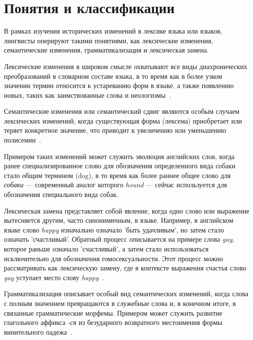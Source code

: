 \documentclass[LI,VKR]{HSEUniversity}
\begin{document}
\section{Понятия и классификации}

В рамках изучения исторических изменений в лексике языка или языков, лингвисты оперируют
такими понятиями, как лексические изменения, семантические изменения,
грамматикализация и лексическая замена.

Лексические изменения в широком смысле охватывают все виды диахронических преобразований
в словарном составе языка, в то время как в более узком значении термин относится к
устареванию форм в языке, а также появлению новых, таких как заимствованные слова
и неологизмы~\cite{TahmasebiComputationalApproachesToSemanticChange}.

Семантические изменения или семантический сдвиг являются особым случаем лексических изменений,
когда существующая форма (лексема) приобретает или теряет конкретное значение,
что приводит к увеличению или уменьшению полисемии~\cite{TahmasebiComputationalApproachesToSemanticChange}.

Примером таких изменений может служить эволюция английских слов, когда ранее специализированное
слово для обозначения определенного вида собаки стало общим термином (dog),
в то время как более раннее общее слово для \textit{собаки} — современный аналог которого
\textit{hound} — сейчас используется для обозначения специального вида собак.

Лексическая замена представляет собой явление, когда одно слово или выражение вытесняется другим,
часто синонимичным, в языке.
Например, в английском языке слово \textit{happy} изначально означало ’быть удачливым’,
но затем стало означать ’счастливый’.
Обратный процесс описывается на примере слова \textit{gay}, которое раньше означало ’счастливый’,
а затем стало использоваться исключительно для обозначения гомосексуальности.
Этот процесс можно рассматривать как лексическую замену,
где в контексте выражения счастья слово \textit{gay}
уступает место слову \textit{happy}~\cite{TahmasebiComputationalApproachesToSemanticChange, Periti2024AnalyzingLexicalReplacements}.

Грамматикализация описывает особый вид семантических изменений, когда слова с
полным значением превращаются в служебные слова и, в конечном итоге,
в связанные грамматические морфемы.
Примером может служить развитие глагольного аффикса \textit{-ся} из
безударного возвратного местоимения формы винительного
падежа~\cite{TahmasebiComputationalApproachesToSemanticChange, Maysak2016}.
\end{document}
